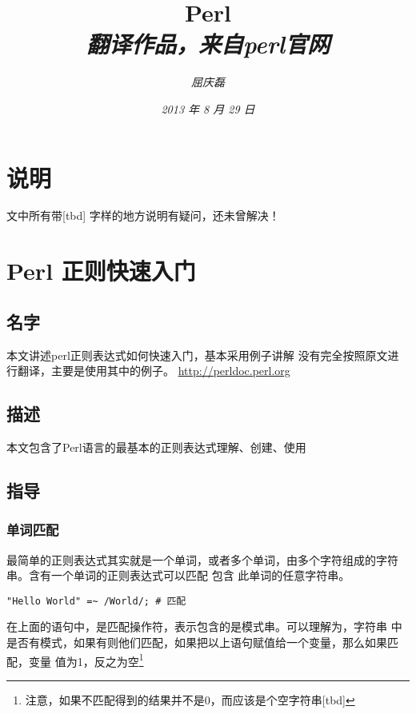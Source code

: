 \documentclass{article}
\begin{document}
\title{%
  {\huge \textsf{Perl}\\\smallskip}%
  {\small \textit{翻译作品，来自perl官网}}
}

\author{\textit{屈庆磊}\\[2mm]
       }

\date{\textit{2013 年 8 月 29 日}}

\maketitle
\begin{multicols}{2}
\tableofcontents
\end{multicols}

\section{说明}
文中所有带[tbd] 字样的地方说明有疑问，还未曾解决！

\section{Perl 正则快速入门}
\subsection{名字}
本文讲述perl正则表达式如何快速入门，基本采用例子讲解
没有完全按照原文进行翻译，主要是使用其中的例子。
\url{http://perldoc.perl.org}
\subsection{描述}
本文包含了Perl语言的最基本的正则表达式理解、创建、使用
\subsection{指导}

\subsubsection{单词匹配}
最简单的正则表达式其实就是一个单词，或者多个单词，由多个字符组成的字符串。含有一个单词的正则表达式可以匹配 包含
此单词的任意字符串。

\begin{verbatim}
"Hello World" =~ /World/; # 匹配
\end{verbatim}

在上面的语句中，\code{{\color{blue}=~}}是匹配操作符，\code{{\color{blue}//}}表示包含的是模式串。可以理解为，字符串
 中是否有模式，如果有则他们匹配，如果把以上语句赋值给一个变量，那么如果匹配，变量
值为1，反之为空\footnote{注意，如果不匹配得到的结果并不是0，而应该是个空字符串[tbd]}
\end{document}
